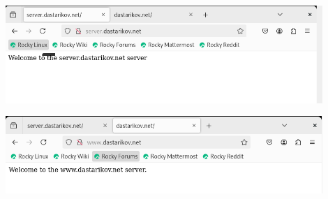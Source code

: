 \begin{enumerate}
\begin{center}
    \centering
    \includegraphics[width=0.9\textwidth]{../images/image11.png}
    \label{11}
\end{center}

\begin{center}
    \centering
    \includegraphics[width=0.9\textwidth]{../images/image12.png}
    \label{12}
\end{center}
\end{enumerate}      

